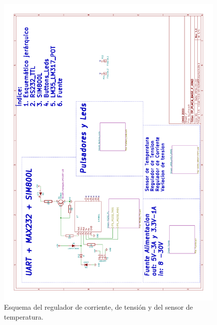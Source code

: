 \begin{figure}[h]
      \centering
      \includegraphics[page=4,scale=0.3,angle=270]{./Figures/schematic.pdf}
      \caption{Esquema del regulador de corriente, de tensión y del sensor de temperatura.}
      \label{fig:temp_tens}
\end{figure}

